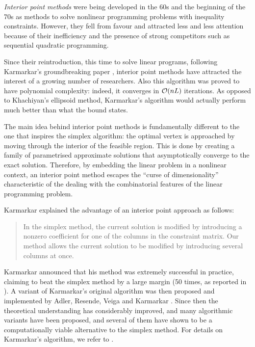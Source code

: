 {\em Interior point methods} were being developed in the 60s and the 
beginning of the 70s as methods to solve nonlinear programming problems 
with inequality constraints. 
However, they fell from favour and attracted less and less attention
because of their inefficiency and the presence of strong competitors
such as sequential quadratic programming.

Since their reintroduction, this time to solve linear programs, 
following Karmarkar's groundbreaking paper
\cite{Karmarkar}, interior point methods have attracted 
the interest of a growing number of researchers.
Also this algorithm was proved to have polynomial complexity: 
indeed, it converges in $\mathcal{O}(nL)$ iterations. As opposed to
Khachiyan's ellipsoid method, Karmarkar's algorithm would actually
perform much better than what the bound states.

The main idea behind interior point methods is fundamentally different 
to the one that inspires the simplex algorithm: the optimal vertex 
is approached by moving through the interior of the feasible region.
This is done by creating a family of parametrised approximate solutions
that asymptotically converge to the exact solution.
Therefore, by embedding the linear problem in a nonlinear context,
an interior point method escapes the ``curse of dimensionality''
characteristic of the dealing with the combinatorial features of the 
linear programming problem.

Karmarkar \cite{Karmarkar} explained the advantage of an
interior point approach as follows:
\begin{quotation}%
In the simplex method, the current solution is modified by introducing
a nonzero coefficient for one of the columns in the constraint
matrix. Our method allows the current solution to be modified by
introducing several columns at once.%
\end{quotation}


Karmarkar announced that his method was extremely successful in practice, 
claiming to beat the simplex method by a large margin (50 times,
as reported in \cite{MWright92}).
A variant of Karmarkar's original algorithm was then proposed and 
implemented by Adler, Resende, Veiga and Karmarkar 
\cite{AdlerResendeVeigaKarmarkar89}.
Since then the theoretical understanding has considerably improved,
and many algorithmic variants have been proposed, and several of
them have shown to be a computationally viable alternative to the
simplex method.
For details on Karmarkar's algorithm, we refer to
\cite[ch.6]{FangPuthenpura93}.

